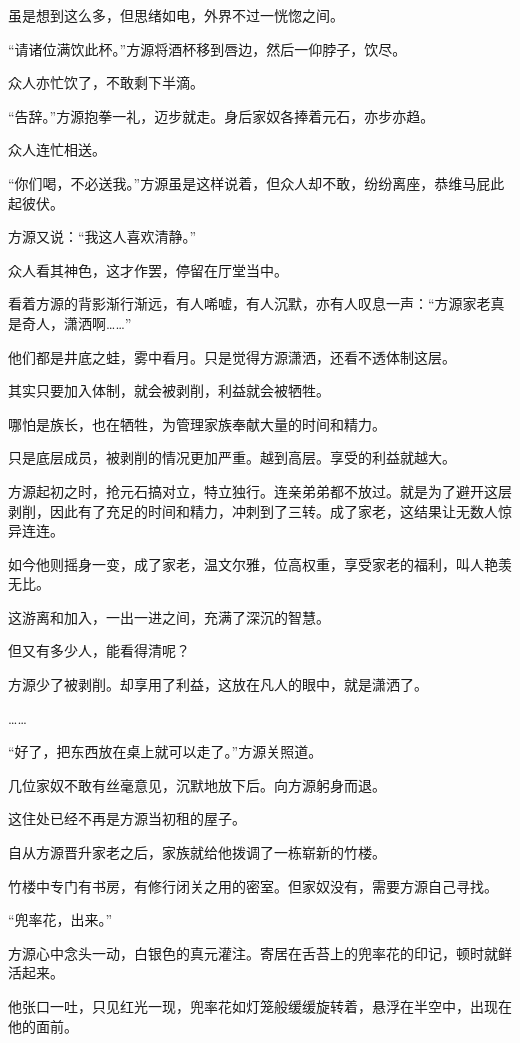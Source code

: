 \begin{this_body}
虽是想到这么多，但思绪如电，外界不过一恍惚之间。

“请诸位满饮此杯。”方源将酒杯移到唇边，然后一仰脖子，饮尽。

众人亦忙饮了，不敢剩下半滴。

“告辞。”方源抱拳一礼，迈步就走。身后家奴各捧着元石，亦步亦趋。

众人连忙相送。

“你们喝，不必送我。”方源虽是这样说着，但众人却不敢，纷纷离座，恭维马屁此起彼伏。

方源又说：“我这人喜欢清静。”

众人看其神色，这才作罢，停留在厅堂当中。

看着方源的背影渐行渐远，有人唏嘘，有人沉默，亦有人叹息一声：“方源家老真是奇人，潇洒啊……”

他们都是井底之蛙，雾中看月。只是觉得方源潇洒，还看不透体制这层。

其实只要加入体制，就会被剥削，利益就会被牺牲。

哪怕是族长，也在牺牲，为管理家族奉献大量的时间和精力。

只是底层成员，被剥削的情况更加严重。越到高层。享受的利益就越大。

方源起初之时，抢元石搞对立，特立独行。连亲弟弟都不放过。就是为了避开这层剥削，因此有了充足的时间和精力，冲刺到了三转。成了家老，这结果让无数人惊异连连。

如今他则摇身一变，成了家老，温文尔雅，位高权重，享受家老的福利，叫人艳羡无比。

这游离和加入，一出一进之间，充满了深沉的智慧。

但又有多少人，能看得清呢？

方源少了被剥削。却享用了利益，这放在凡人的眼中，就是潇洒了。

……

“好了，把东西放在桌上就可以走了。”方源关照道。

几位家奴不敢有丝毫意见，沉默地放下后。向方源躬身而退。

这住处已经不再是方源当初租的屋子。

自从方源晋升家老之后，家族就给他拨调了一栋崭新的竹楼。

竹楼中专门有书房，有修行闭关之用的密室。但家奴没有，需要方源自己寻找。

“兜率花，出来。”

方源心中念头一动，白银色的真元灌注。寄居在舌苔上的兜率花的印记，顿时就鲜活起来。

他张口一吐，只见红光一现，兜率花如灯笼般缓缓旋转着，悬浮在半空中，出现在他的面前。


\end{this_body}
